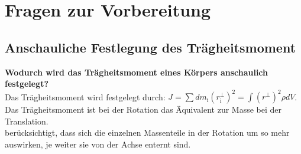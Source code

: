 \chapter{Fragen zur Vorbereitung}
\section{Anschauliche Festlegung des Trägheitsmoment}\label{Frage1}
\textbf{Wodurch wird das Trägheitsmoment eines Körpers anschaulich festgelegt?}\\
Das Trägheitsmoment wird festgelegt durch: \(J=\sum d m_\text{i} (r_\text{i}^{\perp})^2=\int (r^{\perp})^2\rho dV\).\\
Das Trägheitsmoment ist bei der Rotation das Äquivalent zur Masse bei der Translation.\\
\glqq[Dieses] berücksichtigt, dass sich die einzelnen Massenteile in der Rotation um so mehr auswirken,
je weiter sie von der Achse enternt sind.\grqq$\:\:\:$\citep[S. 80]{Gerthsen}
